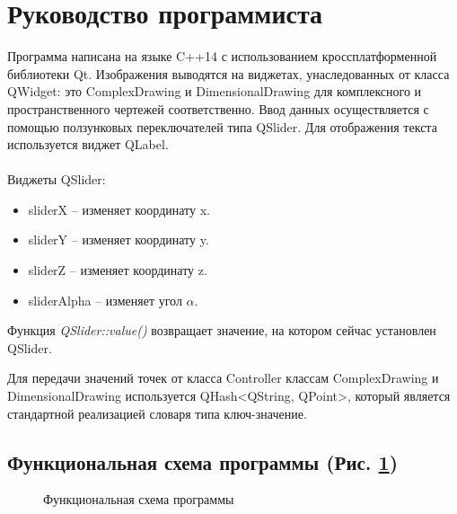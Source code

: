 \documentclass[13pt]{extarticle}
\begin{document}
\section{Руководство программиста}
Программа написана на языке C++14 с использованием кроссплатформенной библиотеки Qt. Изображения выводятся на виджетах, унаследованных от класса QWidget: это ComplexDrawing и DimensionalDrawing для комплексного и пространственного чертежей соответственно. Ввод данных осуществляется с помощью ползунковых переключателей типа QSlider. Для отображения текста используется виджет QLabel.
\\\\
Виджеты QSlider:
\begin{itemize}
	\item sliderX -- изменяет координату x.
	\item sliderY -- изменяет координату y.
	\item sliderZ -- изменяет координату z.
	\item sliderAlpha -- изменяет угол $\alpha$.
\end{itemize}

Функция \emph{QSlider::value()} возвращает значение, на котором сейчас установлен QSlider.

Для передачи значений точек от класса Controller классам ComplexDrawing и DimensionalDrawing используется QHash<QString, QPoint>, который является стандартной реализацией словаря типа ключ-значение.
\subsection{Функциональная схема программы (Рис. \ref{fig:classDyagr})}

	\begin{figure}[h]
		\caption{Функциональная схема программы}
		\label{fig:classDyagr}
	
	\end{figure}
	
\end{document}
